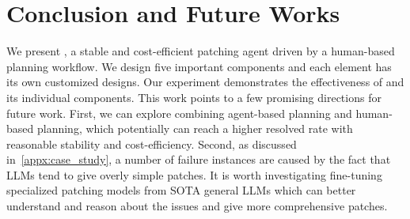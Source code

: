 \section{Conclusion and Future Works}
\label{sec:conclusion}

We present \sys, a stable and cost-efficient patching agent driven by a human-based planning workflow.
We design five important components and each element has its own customized designs.
Our experiment demonstrates the effectiveness of \sys and its individual components.
This work points to a few promising directions for future work. 
First, we can explore combining agent-based planning and human-based planning, which potentially can reach a higher resolved rate with reasonable stability and cost-efficiency. 
Second, as discussed in~\cref{appx:case_study}, a number of failure instances are caused by the fact that LLMs tend to give overly simple patches.
It is worth investigating fine-tuning specialized patching models from SOTA general LLMs which can better understand and reason about the issues and give more comprehensive patches. 
